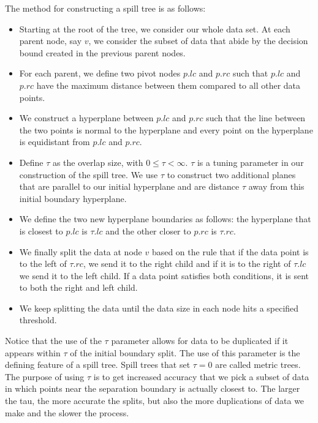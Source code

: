 \vspace{5 mm}
\noindent
The method for constructing a spill tree is as follows:

\begin{itemize}
  \item Starting at the root of the tree, we consider our whole data set. At 
  each parent node, say $v$, we consider the subset of data that abide by the 
  decision bound created in the previous parent nodes.
  \item For each parent, we define two pivot nodes $p.lc$ and $p.rc$ such that 
  $p.lc$ and $p.rc$ have the maximum distance between them compared to all 
  other data points.
  \item We construct a hyperplane between $p.lc$ and $p.rc$ such that the line 
  between the two points is normal to the hyperplane and every point on the 
  hyperplane is equidistant from $p.lc$ and $p.rc$.
  \item Define $\tau$ as the overlap size, with $0 \le \tau < \infty$. $\tau$ 
  is a tuning parameter in our construction of the spill tree. We use $\tau$ 
  to construct two additional planes that are parallel to our initial 
  hyperplane and are distance $\tau$ away from this initial boundary hyperplane.
  \item We define the two new hyperplane boundaries as follows: the hyperplane 
  that is closest to $p.lc$ is $\tau.lc$ and the other closer to $p.rc$ is 
  $\tau.rc$.
  \item We finally split the data at node $v$ based on the rule that if the 
  data point is to the left of $\tau.rc$, we send it to the right child and if 
  it is to the right of $\tau.lc$ we send it to the left child. If a data point 
  satisfies both conditions, it is sent to both the right and left child.
  \item We keep splitting the data until the data size in each node hits a 
  specified threshold.
\end{itemize}

\vspace{5 mm}
\noindent
Notice that the use of the $\tau$ parameter allows for data to be duplicated if 
it appears within $\tau$ of the initial boundary split. The use of this 
parameter is the defining feature of a spill tree. Spill trees that set 
$\tau = 0$ are called metric trees. The purpose of using $\tau$ is to get 
increased accuracy that we pick a subset of data in which points near the 
separation boundary is actually closest to. The larger the tau, the more 
accurate the splits, but also the more duplications of data we make and the 
slower the process.

